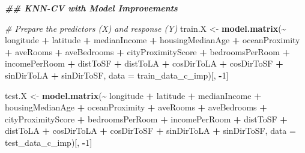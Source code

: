 \documentclass[
]{article}
\newenvironment{Shaded}{\begin{snugshade}}{\end{snugshade}}
\newcommand{\AttributeTok}[1]{\textcolor[rgb]{0.13,0.29,0.53}{#1}}
\newcommand{\CommentTok}[1]{\textcolor[rgb]{0.56,0.35,0.01}{\textit{#1}}}
\newcommand{\DecValTok}[1]{\textcolor[rgb]{0.00,0.00,0.81}{#1}}
\newcommand{\DocumentationTok}[1]{\textcolor[rgb]{0.56,0.35,0.01}{\textbf{\textit{#1}}}}
\newcommand{\FunctionTok}[1]{\textcolor[rgb]{0.13,0.29,0.53}{\textbf{#1}}}
\newcommand{\NormalTok}[1]{#1}
\newcommand{\OtherTok}[1]{\textcolor[rgb]{0.56,0.35,0.01}{#1}}
\newcommand{\SpecialCharTok}[1]{\textcolor[rgb]{0.81,0.36,0.00}{\textbf{#1}}}
\begin{document}
\begin{Shaded}
\begin{Highlighting}[]
\DocumentationTok{\#\# KNN{-}CV with Model Improvements}

\CommentTok{\# Prepare the predictors (X) and response (Y)}
\NormalTok{train.X }\OtherTok{\textless{}{-}} \FunctionTok{model.matrix}\NormalTok{(}\SpecialCharTok{\textasciitilde{}}\NormalTok{ longitude }\SpecialCharTok{+} 
\NormalTok{                          latitude }\SpecialCharTok{+} 
\NormalTok{                          medianIncome }\SpecialCharTok{+} 
\NormalTok{                          housingMedianAge }\SpecialCharTok{+} 
\NormalTok{                          oceanProximity }\SpecialCharTok{+} 
\NormalTok{                          aveRooms }\SpecialCharTok{+} 
\NormalTok{                          aveBedrooms }\SpecialCharTok{+}
\NormalTok{                          cityProximityScore }\SpecialCharTok{+} 
\NormalTok{                          bedroomsPerRoom }\SpecialCharTok{+} 
\NormalTok{                          incomePerRoom }\SpecialCharTok{+}
\NormalTok{                          distToSF }\SpecialCharTok{+}
\NormalTok{                          distToLA }\SpecialCharTok{+}
\NormalTok{                          cosDirToLA }\SpecialCharTok{+}
\NormalTok{                          cosDirToSF }\SpecialCharTok{+}
\NormalTok{                          sinDirToLA }\SpecialCharTok{+}
\NormalTok{                          sinDirToSF, }
                        \AttributeTok{data =}\NormalTok{ train\_data\_c\_imp)[, }\SpecialCharTok{{-}}\DecValTok{1}\NormalTok{]}

\NormalTok{test.X }\OtherTok{\textless{}{-}} \FunctionTok{model.matrix}\NormalTok{(}\SpecialCharTok{\textasciitilde{}}\NormalTok{  longitude }\SpecialCharTok{+} 
\NormalTok{                          latitude }\SpecialCharTok{+} 
\NormalTok{                          medianIncome }\SpecialCharTok{+} 
\NormalTok{                          housingMedianAge }\SpecialCharTok{+} 
\NormalTok{                          oceanProximity }\SpecialCharTok{+} 
\NormalTok{                          aveRooms }\SpecialCharTok{+} 
\NormalTok{                          aveBedrooms }\SpecialCharTok{+}
\NormalTok{                          cityProximityScore }\SpecialCharTok{+} 
\NormalTok{                          bedroomsPerRoom }\SpecialCharTok{+} 
\NormalTok{                          incomePerRoom }\SpecialCharTok{+}
\NormalTok{                          distToSF }\SpecialCharTok{+}
\NormalTok{                          distToLA }\SpecialCharTok{+}
\NormalTok{                          cosDirToLA }\SpecialCharTok{+}
\NormalTok{                          cosDirToSF }\SpecialCharTok{+}
\NormalTok{                          sinDirToLA }\SpecialCharTok{+}
\NormalTok{                          sinDirToSF, }
                       \AttributeTok{data =}\NormalTok{ test\_data\_c\_imp)[, }\SpecialCharTok{{-}}\DecValTok{1}\NormalTok{]}


\end{Highlighting}
\end{Shaded}
\end{document}
